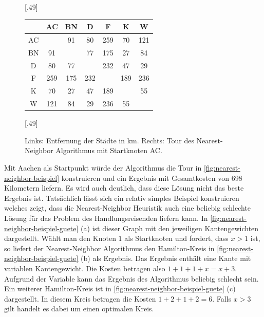 \documentclass{article}
\begin{document}

\begin{figure}[h]
	\centering
	\subcaptionbox{\label{tbl:entfernungen-staedte}}[.49\linewidth]
	{
		\begin{tabular}{ |c|c|c|c|c|c|c| }
\hline
 & AC & BN & D& F & K & W \\ 
\hline
AC &  & 91 & 80 & 259 & 70 & 121 \\ 
\hline
BN & 91 &  & 77 & 175 & 27 & 84 \\ 
\hline
D & 80 & 77 &  & 232 & 47 & 29 \\ 
\hline
F & 259 & 175 & 232 &  & 189 & 236 \\ 
\hline
K & 70 & 27 & 47 & 189 &  & 55 \\ 
\hline
W & 121 & 84 & 29 & 236 & 55 &  \\ 
\hline
\end{tabular}
	}
	\subcaptionbox{\label{fig:nearest-neighbor-tour}}[.49\linewidth]
	{
	}
\caption{Links: Entfernung der Städte in km. Rechts: Tour des Nearest-Neighbor Algorithmus mit Startknoten AC.}
\label{fig:nearest-neighbor-beispiel}
\end{figure}



Mit Aachen als Startpunkt würde der Algorithmus die Tour in \autoref{fig:nearest-neighbor-beispiel} konstruieren und ein Ergebnis mit Gesamtkosten von 698 Kilometern liefern. Es wird auch deutlich, dass diese Lösung nicht das beste Ergebnis ist. Tatsächlich lässt sich ein relativ simples Beispiel konstruieren welches zeigt, dass die Nearest-Neighbor Heuristik auch eine beliebig schlechte Lösung für das Problem des Handlungsreisenden liefern kann. In \autoref{fig:nearest-neighbor-beispiel-guete} (a) ist dieser Graph mit den jeweiligen Kantengewichten dargestellt. Wählt man den Knoten $1$ als Startknoten und fordert, dass $x>1$ ist, so liefert der Nearest-Neighbor Algorithmus den Hamilton-Kreis in \autoref{fig:nearest-neighbor-beispiel-guete} (b) als Ergebnis. Das Ergebnis enthält eine Kante mit variablen Kantengewicht. Die Kosten betragen also $1+1+1+x = x +3$. Aufgrund der Variable kann das Ergebnis des Algorithmus beliebig schlecht sein. Ein weiterer Hamilton-Kreis ist in \autoref{fig:nearest-neighbor-beispiel-guete} (c) dargestellt. In diesem Kreis betragen die Kosten $1+2+1+2 = 6$.
Falls  $x>3$ gilt handelt es dabei um einen optimalen Kreis. 
\end{document}
